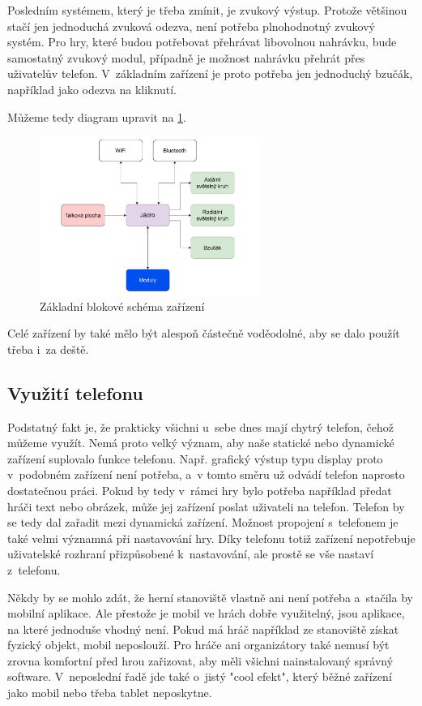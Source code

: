 Posledním systémem, který je třeba zmínit, je zvukový výstup.
Protože většinou stačí jen jednoduchá zvuková odezva, není potřeba plnohodnotný zvukový systém.
Pro hry, které budou potřebovat přehrávat libovolnou nahrávku, bude samostatný zvukový modul, případně je možnost nahrávku přehrát přes uživatelův telefon.
V~základním zařízení je proto potřeba jen jednoduchý bzučák, například jako odezva na kliknutí.

Můžeme tedy diagram upravit na \ref{fig:diagram_zanoreni_1}.
\begin{figure}[h]
    \centering
    \includegraphics[width=0.65\textwidth]{text/TeoretickyUvod/AplikaceHernichZarizeni/diagram/zanoreni_1.pdf}
    \caption{Základní blokové schéma zařízení}
    \label{fig:diagram_zanoreni_1}
\end{figure}

Celé zařízení by také mělo být alespoň částečně voděodolné, aby se dalo použít třeba i~za deště.

\subsection{Využití telefonu \label{VyuzitiTelefonu}}
Podstatný fakt je, že prakticky všichni u~sebe dnes mají chytrý telefon, čehož můžeme využít.
Nemá proto velký význam, aby naše statické nebo dynamické zařízení suplovalo funkce telefonu.
Např. grafický výstup typu display proto v~podobném zařízení není potřeba, a~v tomto směru už odvádí telefon naprosto dostatečnou práci.
Pokud by tedy v~rámci hry bylo potřeba například předat hráči text nebo obrázek, může jej zařízení poslat uživateli na telefon.
Telefon by se tedy dal zařadit mezi dynamická zařízení.
Možnost propojení s~telefonem je také velmi významná při nastavování hry.
Díky telefonu totiž zařízení nepotřebuje uživatelské rozhraní přizpůsobené k~nastavování, ale prostě se vše nastaví z~telefonu.

Někdy by se mohlo zdát, že herní stanoviště vlastně ani není potřeba a~stačila by mobilní aplikace.
Ale přestože je mobil ve hrách dobře využitelný, jsou aplikace, na které jednoduše vhodný není.
Pokud má hráč například ze stanoviště získat fyzický objekt, mobil neposlouží.
Pro hráče ani organizátory také nemusí být zrovna komfortní před hrou zařizovat, aby měli všichni nainstalovaný správný software.
V~neposlední řadě jde také o~jistý "cool efekt", který běžné zařízení jako mobil nebo třeba tablet neposkytne. %



